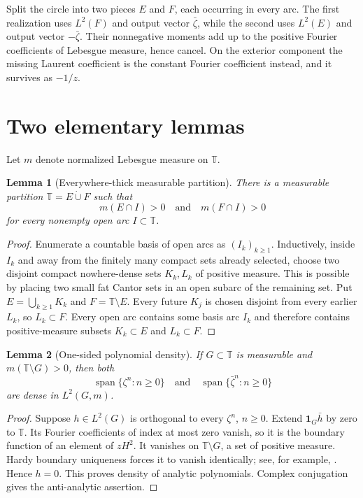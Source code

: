 \documentclass[11pt]{article}
\newtheorem{lemma}{Lemma}
\newcommand{\T}{\mathbb T}
\newcommand{\one}{\mathbf 1}
\begin{document}
Split the circle into two pieces $E$ and $F$, each occurring in every arc.
The first realization uses $L^2(F)$ and output vector $\bar\zeta$, while the
second uses $L^2(E)$ and output vector $-\bar\zeta$. Their nonnegative moments
add up to the positive Fourier coefficients of Lebesgue measure, hence cancel.
On the exterior component the missing Laurent coefficient is the constant
Fourier coefficient instead, and it survives as $-1/z$.

\section{Two elementary lemmas}

Let $m$ denote normalized Lebesgue measure on $\T$.

\begin{lemma}[Everywhere-thick measurable partition]\label{lem:partition}
There is a measurable partition $\T=E\mathbin{\dot\cup}F$ such that
\[
             m(E\cap I)>0\quad\text{and}\quad m(F\cap I)>0
\]
for every nonempty open arc $I\subset\T$.
\end{lemma}

\begin{proof}
Enumerate a countable basis of open arcs as $(I_k)_{k\geq1}$. Inductively,
inside $I_k$ and away from the finitely many compact sets already selected,
choose two disjoint compact nowhere-dense sets $K_k,L_k$ of positive measure.
This is possible by placing two small fat Cantor sets in an open subarc of the
remaining set. Put $E=\bigcup_{k\geq1}K_k$ and $F=\T\setminus E$. Every future
$K_j$ is chosen disjoint from every earlier $L_k$, so $L_k\subset F$. Every
open arc contains some basis arc $I_k$ and therefore contains positive-measure
subsets $K_k\subset E$ and $L_k\subset F$.
\end{proof}

\begin{lemma}[One-sided polynomial density]\label{lem:density}
If $G\subset\T$ is measurable and $m(\T\setminus G)>0$, then both
\[
 \operatorname{span}\{\zeta^n:n\geq0\}
 \quad\text{and}\quad
 \operatorname{span}\{\bar\zeta^n:n\geq0\}
\]
are dense in $L^2(G,m)$.
\end{lemma}

\begin{proof}
Suppose $h\in L^2(G)$ is orthogonal to every $\zeta^n$, $n\geq0$. Extend
$\one_G\bar h$ by zero to $\T$. Its Fourier coefficients of index at most zero
vanish, so it is the boundary function of an element of $zH^2$. It vanishes on
$\T\setminus G$, a set of positive measure. Hardy boundary uniqueness forces
it to vanish identically; see, for example, \cite[Chapter~II]{Duren}. Hence
$h=0$. This proves density of analytic polynomials. Complex conjugation gives
the anti-analytic assertion.
\end{proof}
\end{document}
